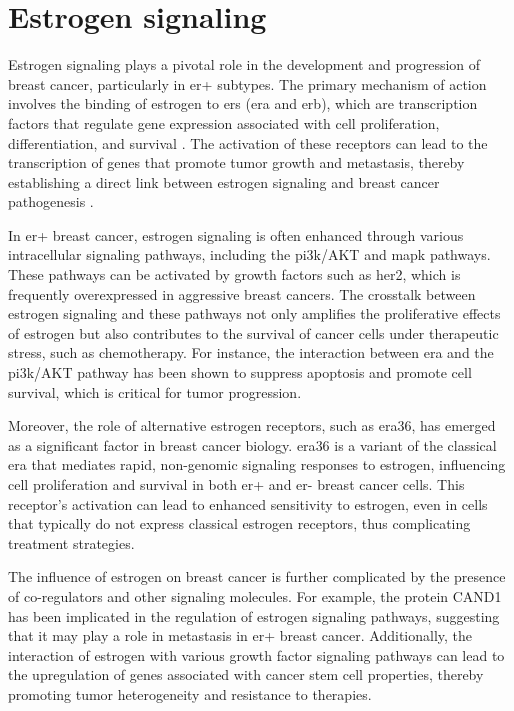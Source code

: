 \section{Estrogen signaling}
\label{sec:estrogen_signaling}

Estrogen signaling plays a pivotal role in the development and progression of
breast cancer, particularly in \gls{er+} subtypes.
The primary mechanism of action involves the binding of estrogen to \glspl{er}
(\gls{era} and \gls{erb}), which are transcription factors that regulate gene
expression associated with cell proliferation, differentiation, and survival
\supercite{misawa_estrogen-related_2015,lattouf_lkb1_2016}.
The activation of these receptors can lead to the transcription of genes that
promote tumor growth and metastasis, thereby establishing a direct link between
estrogen signaling and breast cancer pathogenesis
\supercite{feng_cross-talk_2020}.

In \gls{er+} breast cancer, estrogen signaling is often enhanced through
various intracellular signaling pathways, including the \gls{pi3k}/AKT and
\gls{mapk} pathways.
These pathways can be activated by growth factors such as \gls{her2}, which is
frequently overexpressed in aggressive breast
cancers\supercite{bratton_regulation_2010,salmeron-hernandez_bcas2_2019}.
The crosstalk between estrogen signaling and these pathways not only amplifies
the proliferative effects of estrogen but also contributes to the survival of
cancer cells under therapeutic stress, such as
chemotherapy\supercite{bratton_regulation_2010,george_hypoxia_2012}.
For instance, the interaction between \gls{era} and the \gls{pi3k}/AKT pathway
has been shown to suppress apoptosis and promote cell survival, which is
critical for tumor
progression\supercite{bratton_regulation_2010,george_hypoxia_2012}.

Moreover, the role of alternative estrogen receptors, such as \gls{era}36, has
emerged as a significant factor in breast cancer biology.
\gls{era}36 is a variant of the classical \gls{era} that mediates
rapid, non-genomic signaling responses to estrogen, influencing cell
proliferation and survival in both \gls{er+} and \gls{er-} breast cancer
cells\supercite{deng_er-36-mediated_2014,zhang_positive_2011}.
This receptor's activation can lead to enhanced sensitivity to estrogen, even
in cells that typically do not express classical estrogen receptors, thus
complicating treatment strategies\supercite{zhang_positive_2011}.

The influence of estrogen on breast cancer is further complicated by the
presence of co-regulators and other signaling molecules.
For example, the protein CAND1 has been implicated in the regulation of
estrogen signaling pathways, suggesting that it may play a role in metastasis
in \gls{er+} breast cancer\supercite{alhammad_bioinformatics_2022}.
Additionally, the interaction of estrogen with various growth factor signaling
pathways can lead to the upregulation of genes associated with cancer stem cell
properties, thereby promoting tumor heterogeneity and resistance to
therapies\supercite{fillmore_estrogen_2010,xue_sox9fxyd3src_2019}.
